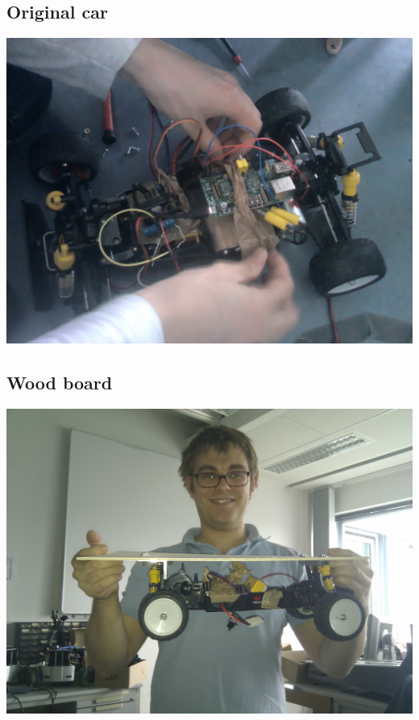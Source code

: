 \documentclass[pdf]{beamer}
\begin{document}
\subsection{Original car}
\begin{frame}
  \begin{center}
  \includegraphics[width = \textwidth]{pics/raw/original.png}
  \end{center}
\end{frame}

\subsection{Wood board}
\begin{frame}
  \begin{center}
  \includegraphics[width = \textwidth]{pics/raw/brett.jpg}
  \end{center}
\end{frame}
\end{document}
